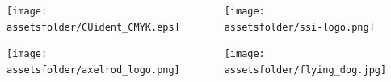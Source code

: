 \documentclass{beamer}
\newcommand{\assetsfolder}{./assets}
\begin{document}
    \begin{frame}
               \begin{columns}
                   \begin{column}{.45\textwidth}
                       \begin{center}
                       \texttt{[image: \\assetsfolder/CUident\_CMYK.eps]}
                       \end{center}

                       \begin{center}
                       \texttt{[image: \\assetsfolder/axelrod\_logo.png]}
                       \end{center}
                   \end{column}
                   \begin{column}{.45\textwidth}
                       \begin{center}
                       \texttt{[image: \\assetsfolder/ssi-logo.png]}
                       \end{center}

                       \pause
                       \begin{center}
                       \texttt{[image: \\assetsfolder/flying\_dog.jpg]}
                       \end{center}
                   \end{column}
               \end{columns}

    \end{frame}
\end{document}
